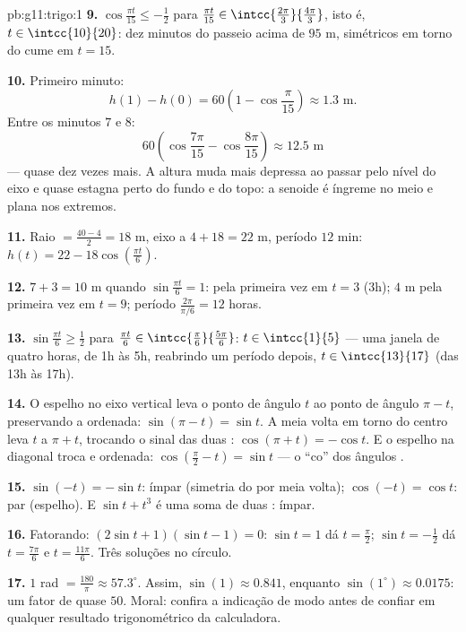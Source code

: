 \begin{solution}{pb:g11:trigo:1}
\textbf{9.} $\cos\frac{\pi t}{15} \leq -\frac12$ para
$\frac{\pi t}{15} \in \intcc{\frac{2\pi}{3}}{\frac{4\pi}{3}}$,
isto é, $t \in \intcc{10}{20}$: dez minutos do passeio acima de
$95$ m, simétricos em torno do cume em $t = 15$.

\textbf{10.} Primeiro minuto:
\[
h(1) - h(0) = 60\left(1 - \cos\frac{\pi}{15}\right)
\approx 1.3 \text{ m}.
\]
Entre os minutos $7$ e $8$:
\[
60\left(\cos\frac{7\pi}{15} - \cos\frac{8\pi}{15}\right)
\approx 12.5 \text{ m}
\]
--- quase dez vezes mais. A altura muda mais depressa ao passar
pelo nível do eixo e quase estagna perto do fundo e do topo: a
senoide é íngreme no meio e plana nos extremos.

\textbf{11.} Raio $= \frac{40 - 4}{2} = 18$ m, eixo a
$4 + 18 = 22$ m, período $12$ min:
$h(t) = 22 - 18\cos\left(\frac{\pi t}{6}\right)$.

\textbf{12.}  $7 + 3 = 10$ m quando
$\sin\frac{\pi t}{6} = 1$: pela primeira vez em $t = 3$ (3h);
 $4$ m pela primeira vez em $t = 9$; período
$\frac{2\pi}{\pi/6} = 12$ horas.

\textbf{13.} $\sin\frac{\pi t}{6} \geq \frac12$ para
$\frac{\pi t}{6} \in \intcc{\frac\pi6}{\frac{5\pi}{6}}$:
$t \in \intcc{1}{5}$ --- uma janela de quatro horas, de 1h às
5h, reabrindo um período depois, $t \in \intcc{13}{17}$ (das
13h às 17h).

\textbf{14.} O espelho no eixo vertical leva o ponto de ângulo
$t$ ao ponto de ângulo $\pi - t$, preservando a ordenada:
$\sin(\pi - t) = \sin t$. A meia volta em torno do centro leva
$t$ a $\pi + t$, trocando o sinal das duas :
$\cos(\pi + t) = -\cos t$. E o espelho na diagonal troca
 e ordenada:
$\cos\left(\frac\pi2 - t\right) = \sin t$ --- o ``co'' dos
ângulos .

\textbf{15.} $\sin(-t) = -\sin t$: ímpar (simetria do 
por meia volta); $\cos(-t) = \cos t$: par (espelho). E
$\sin t + t^3$ é uma soma de duas : ímpar.

\textbf{16.} Fatorando: $(2\sin t + 1)(\sin t - 1) = 0$:
$\sin t = 1$ dá $t = \frac\pi2$; $\sin t = -\frac12$ dá
$t = \frac{7\pi}{6}$ e $t = \frac{11\pi}{6}$. Três soluções no
círculo.

\textbf{17.} $1$ rad $= \frac{180}{\pi} \approx 57.3^\circ$.
Assim, $\sin(1) \approx 0.841$, enquanto
$\sin(1^\circ) \approx 0.0175$: um fator de quase $50$. Moral:
confira a indicação de modo antes de confiar em qualquer
resultado trigonométrico da calculadora.


\end{solution}

